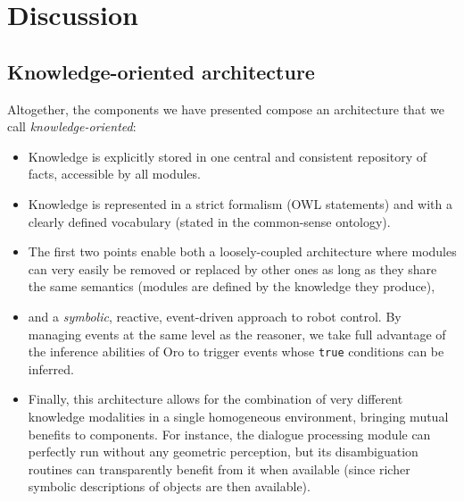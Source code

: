 \documentclass[letterpaper, 10 pt, conference]{ieeeconf}  %
\begin{document}
\section{Discussion}
\label{sect|conclusion}

\subsection{Knowledge-oriented architecture}

Altogether, the components we have presented compose an architecture that we
call \emph{knowledge-oriented}:

\begin{itemize}
    
    \item{Knowledge is explicitly stored in one central and consistent
    repository of facts, accessible by all modules.} 

    \item{Knowledge is represented in a strict formalism (OWL statements) and
    with a clearly defined vocabulary (stated in the common-sense ontology).}

    \item{The first two points enable both a loosely-coupled architecture where
    modules can very easily be removed or replaced by other ones as long as
    they share the same semantics (modules are defined by the knowledge they
    produce),} 

    \item{and a \emph{symbolic}, reactive, event-driven approach to robot control.
    By managing events at the same level as the reasoner, we take full
    advantage of the inference abilities of {\sc Oro} to trigger events whose
    \texttt{true} conditions can be inferred.} 

    \item{Finally, this architecture allows for the combination of very
    different knowledge modalities in a single homogeneous environment,
    bringing mutual benefits to components. For instance, the dialogue
    processing module can perfectly run without any geometric
    perception, but its disambiguation routines can transparently
    benefit from it when available (since richer symbolic descriptions of
    objects are then available).}

\end{itemize}
\end{document}
